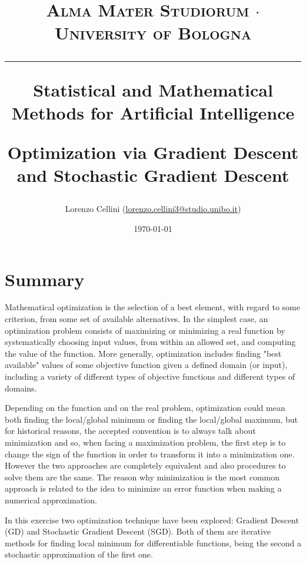 \documentclass[a4paper,10pt]{report}
\begin{document}
\frenchspacing

\title{
  {{\large{\textsc{Alma Mater Studiorum $\cdot$ University of Bologna}}}}
  \rule{\textwidth}{0.4pt}\vspace{3mm}
  \small{Statistical and Mathematical Methods for Artificial Intelligence}

  \large{\textbf{Optimization via Gradient Descent and Stochastic Gradient Descent}}
}

\author{Lorenzo Cellini (\href{mailto:lorenzo.cellini3@studio.unibo.it}{lorenzo.cellini3@studio.unibo.it})}
\date{\today}
\maketitle
\newpage
\tableofcontents
\setcounter{tocdepth}{1}
\newpage


\chapter{Summary}\label{chap:introduction}
Mathematical optimization is the selection of a best element, with regard to some criterion, from some set of available alternatives.
In the simplest case, an optimization problem consists of maximizing or minimizing a real function by systematically choosing input values, from within an allowed set, and computing the value of the function.
More generally, optimization includes finding "best available" values of some objective function given a defined domain (or input), including a variety of different types of objective functions and different types of domains.

Depending on the function and on the real problem, optimization could mean both finding the local/global minimum or finding the local/global maximum, but for historical reasons, the accepted convention is to always talk about minimization and so, when facing a maximization problem, the first step is to change the sign of the function in order to transform it into a minimization one.
However the two approaches are completely equivalent and also procedures to solve them are the same. 
The reason why minimization is the most common approach is related to the idea to minimize an error function when making a numerical approximation.

In this exercise two optimization technique have been explored: Gradient Descent (GD) and Stochastic Gradient Descent (SGD).
Both of them are iterative methods for finding local minimum for differentiable functions, being the second a stochastic approximation of the first one.
\end{document}

